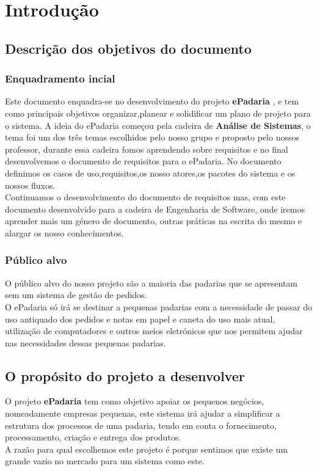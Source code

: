 \chapter{Introdução}
\label{introdução}
\section{Descrição dos objetivos do documento}
\subsection{Enquadramento incial}
Este documento enquadra-se no desenvolvimento do projeto \textbf{ePadaria} , e tem como principais objetivos organizar,planear e solidificar um plano de projeto para o sistema.
A ideia do ePadaria começou pela cadeira de \textbf{Análise de Sistemas}, o tema foi um dos três temas escolhidos pelo nosso grupo e proposto pelo nossos professor, durante essa cadeira fomos aprendendo sobre requisitos e no final desenvolvemos o documento de requisitos para o ePadaria. No documento definimos os casos de uso,requisitos,os nosso atores,os pacotes do sistema e os nossos fluxos.\\
Continuamos o desenvolvimento do documento de requisitos mas, com este documento desenvolvido para a cadeira de Engenharia de Software, onde iremos aprender mais um género de documento, outras práticas na escrita do mesmo e alargar os nosso conhecimentos.

\subsection{Público alvo}
O público alvo do nosso projeto são a maioria das padarias que se apresentam sem um sistema de gestão de pedidos.\\
O ePadaria só irá se destinar a pequenas padarias com a necessidade de passar do uso antiquado dos pedidos e notas em papel e caneta do uso mais atual, utilização de computadores e outros meios eletrónicos que nos permitem ajudar nas necessidades dessas pequenas padarias.

\section{O propósito do projeto a desenvolver}
O projeto \textbf{ePadaria} tem como objetivo apoiar os pequenos negócios, nomeadamente empresas pequenas, este sistema irá ajudar a simplificar a estrutura dos processos de uma padaria, tendo em conta o fornecimento, processamento, criação e entrega dos produtos.
\\
A razão para qual escolhemos este projeto é porque sentimos que existe um grande vazio no mercado para um sistema como este.
